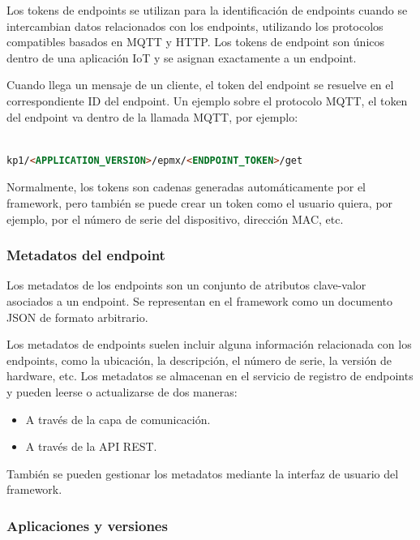 {Los tokens de endpoints se utilizan para la identificación de endpoints cuando se intercambian datos relacionados con los endpoints, utilizando los protocolos compatibles basados en MQTT y HTTP. Los tokens de endpoint son únicos dentro de una aplicación IoT y se asignan exactamente a un endpoint.

Cuando llega un mensaje de un cliente, el token del endpoint se resuelve en el correspondiente ID del endpoint. Un ejemplo sobre el protocolo MQTT, el token del endpoint va dentro de la llamada MQTT, por ejemplo:

\begin{lstlisting}[language=HTML]

kp1/<APPLICATION_VERSION>/epmx/<ENDPOINT_TOKEN>/get

\end{lstlisting}  \label{llamada-mqtt}

Normalmente, los tokens son cadenas generadas automáticamente por el framework, pero también se puede crear un token como el usuario quiera, por ejemplo, por el número de serie del dispositivo, dirección MAC, etc.

\subsubsection{Metadatos del endpoint}

Los metadatos de los endpoints son un conjunto de atributos clave-valor asociados a un endpoint. Se representan en el framework como un documento JSON de formato arbitrario.

Los metadatos de endpoints suelen incluir alguna información relacionada con los endpoints, como la ubicación, la descripción, el número de serie, la versión de hardware, etc. Los metadatos se almacenan en el servicio de registro de endpoints y pueden leerse o actualizarse de dos maneras:

\begin{itemize}
    \item A través de la capa de comunicación.
    \item A través de la API REST.
\end{itemize}

También se pueden gestionar los metadatos mediante la interfaz de usuario del framework.

\subsubsection{Aplicaciones y versiones}

}
